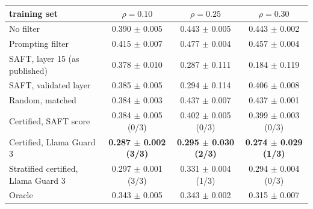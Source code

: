 \begin{tabular}{lccc}
\toprule
training set & $\rho = 0.10$ & $\rho = 0.25$ & $\rho = 0.30$ \\
\midrule
No filter & 0.390 $\pm$ 0.005 & 0.443 $\pm$ 0.005 & 0.443 $\pm$ 0.002 \\
Prompting filter & 0.415 $\pm$ 0.007 & 0.477 $\pm$ 0.004 & 0.457 $\pm$ 0.004 \\
SAFT, layer 15 (as published) & 0.378 $\pm$ 0.010 & 0.287 $\pm$ 0.111 & 0.184 $\pm$ 0.119 \\
SAFT, validated layer & 0.385 $\pm$ 0.005 & 0.294 $\pm$ 0.114 & 0.406 $\pm$ 0.008 \\
Random, matched & 0.384 $\pm$ 0.003 & 0.437 $\pm$ 0.007 & 0.437 $\pm$ 0.001 \\
Certified, SAFT score & 0.384 $\pm$ 0.005 (0/3) & 0.402 $\pm$ 0.005 (0/3) & 0.399 $\pm$ 0.003 (0/3) \\
Certified, Llama Guard 3 & \textbf{0.287 $\pm$ 0.002 (3/3)} & \textbf{0.295 $\pm$ 0.030 (2/3)} & \textbf{0.274 $\pm$ 0.029 (1/3)} \\
Stratified certified, Llama Guard 3 & 0.297 $\pm$ 0.001 (3/3) & 0.331 $\pm$ 0.004 (1/3) & 0.294 $\pm$ 0.004 (0/3) \\
Oracle & 0.343 $\pm$ 0.005 & 0.343 $\pm$ 0.002 & 0.315 $\pm$ 0.007 \\
\bottomrule
\end{tabular}

